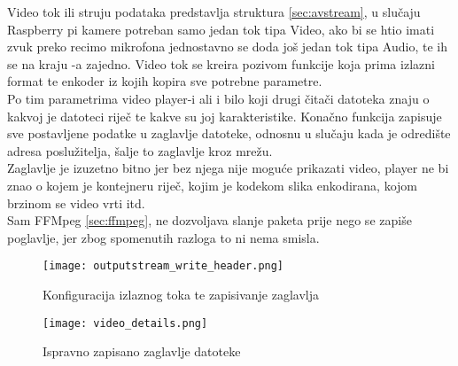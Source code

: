\label{sec:output_format_ctx}
Video tok ili struju podataka predstavlja struktura  \ref{sec:avstream}, u slučaju Raspberry pi kamere
potreban samo jedan tok tipa Video, ako bi se htio imati zvuk preko recimo mikrofona jednostavno se doda još jedan tok
tipa Audio, te ih se na kraju -a zajedno.
\paraBreak
Video tok se kreira pozivom funkcije  koja prima izlazni format te enkoder iz kojih
kopira sve potrebne parametre. \\
Po tim parametrima video player-i ali i bilo koji drugi čitači datoteka znaju o kakvoj je datoteci riječ te kakve su joj
karakteristike.
\paraBreak
Konačno funkcija  zapisuje sve postavljene podatke u zaglavlje datoteke, odnosnu u slučaju
kada je odredište adresa poslužitelja, šalje to zaglavlje kroz mrežu. \\
Zaglavlje je izuzetno bitno jer bez njega nije moguće prikazati video, player ne bi znao o kojem je kontejneru riječ, kojim
je kodekom slika enkodirana, kojom brzinom se video vrti itd. \\
Sam FFMpeg \ref{sec:ffmpeg}, ne dozvoljava slanje paketa prije nego se zapiše poglavlje, jer zbog spomenutih razloga to ni
nema smisla. \cite{ffmpegDocs}

\begin{figure}[h]
  \texttt{[image: outputstream\_write\_header.png]}
  \caption{Konfiguracija izlaznog toka te zapisivanje zaglavlja}
\end{figure}

\begin{figure}[h]
  \centering
  \texttt{[image: video\_details.png]}
  \caption{Ispravno zapisano zaglavlje datoteke}
\end{figure}


